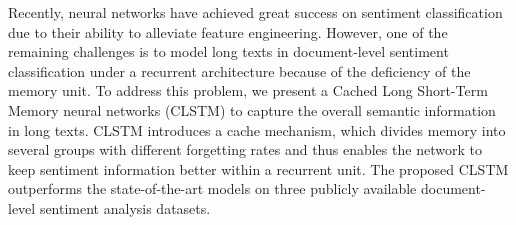 Recently, neural networks have achieved great success on sentiment classification due to their ability to alleviate feature engineering. However, one of the remaining challenges is to model long texts in document-level sentiment classification under a recurrent architecture because of the deficiency of the memory unit. To address this problem, we present a Cached Long Short-Term Memory neural networks (CLSTM) to capture the overall semantic information in long texts. CLSTM introduces a cache mechanism, which divides memory into several groups with different forgetting rates and thus enables the network to keep sentiment information better within a recurrent unit. The proposed CLSTM outperforms the state-of-the-art models on three publicly available document-level sentiment analysis datasets.

